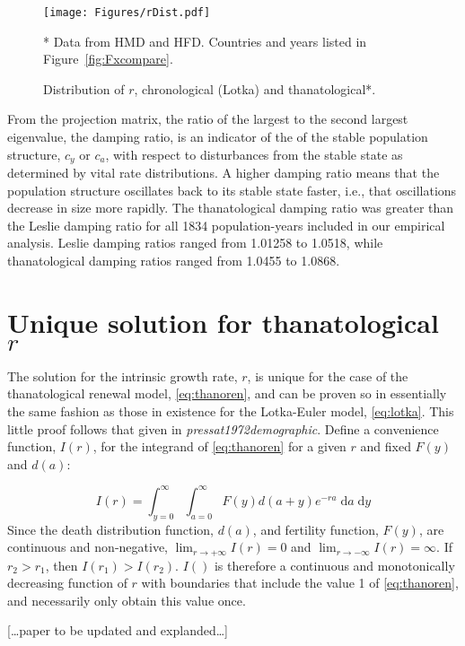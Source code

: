 \documentclass{article}
\newcommand{\dd}{\; \mathrm{d}}
\begin{document}
\begin{figure}[h!]
	\caption{Distribution of $r$, chronological (Lotka) and thanatological*.}
	\begin{center}
		\label{fig:rDist}
		\texttt{[image: Figures/rDist.pdf]}
	\end{center}
	\begin{tiny}
     * Data from HMD and HFD. Countries and years listed in
     Figure~\ref{fig:Fxcompare}.
	\end{tiny}
\end{figure}

From the projection matrix, the ratio of the largest to the second largest
eigenvalue, the damping ratio, is an indicator of the  of the
stable population structure, $c_y$ or $c_a$, with respect to disturbances from the stable state
as determined by vital rate distributions. A higher damping ratio means that the
population structure oscillates back to its stable state faster, i.e., that
oscillations decrease in size more rapidly. The thanatological damping ratio was
greater than the Leslie damping ratio for all 1834 population-years included in
our empirical analysis. Leslie damping ratios ranged from 1.01258 to 1.0518,
while thanatological damping ratios ranged from 1.0455 to 1.0868.

\vspace{2em}

\appendix
\section{Unique solution for thanatological $r$}
\label{app:A}
The solution for the intrinsic growth rate, $r$, is unique for the case of the
thanatological renewal model, \eqref{eq:thanoren}, and can be proven so in
essentially the same fashion as those in existence for the Lotka-Euler model,
\eqref{eq:lotka}. This little proof follows that given in
\textit{pressat1972demographic}. Define a convenience function, $I(r)$, for the
integrand of \eqref{eq:thanoren} for a given $r$ and fixed $F(y)$ and $d(a)$:

\begin{equation}
I(r) = \int_{y=0}^\infty \int_{a=0}^\infty F(y) d(a+y)e^{-ra}\dd a \dd y
\end{equation}
Since the death distribution function, $d(a)$, and fertility
function, $F(y)$, are continuous and non-negative, $\lim_{r \to +\infty} I(r)
= 0$ and $\lim_{r \to -\infty} I(r)= \infty$. If $r_2 > r_1$, then $I(r_1) >
I(r_2)$. $I()$ is therefore a continuous and monotonically decreasing function
of $r$ with boundaries that include the value 1 of \eqref{eq:thanoren}, and
 necessarily only obtain this value once.


[\ldots paper to be updated and explanded\ldots]
\nocite{HMD,HFD}

    
\end{document}
